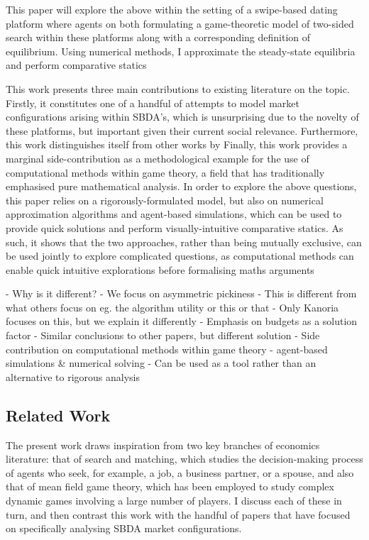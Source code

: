 This paper will explore the above within the setting of a swipe-based dating platform where agents on both formulating a game-theoretic model of two-sided search within these platforms along with a corresponding definition of equilibrium. 
Using numerical methods, I approximate the steady-state equilibria and perform comparative statics 

This work presents three main contributions to existing literature on the topic. 
Firstly, it constitutes one of a handful of attempts to model market configurations arising within SBDA's, which is unsurprising due to the novelty of these platforms, but important given their current social relevance. 
Furthermore, this work distinguishes itself from other works by 
Finally, this work provides a marginal side-contribution as a methodological example for the use of computational methods within game theory, a field that has traditionally emphasised pure mathematical analysis. 
In order to explore the above questions, this paper relies on a rigorously-formulated model, but also on numerical approximation algorithms and agent-based simulations, which can be used to provide quick solutions and perform visually-intuitive comparative statics. 
As such, it shows that the two approaches, rather than being mutually exclusive, can be used jointly to explore complicated questions, as computational methods can enable quick intuitive explorations before formalising maths arguments

- Why is it different?
    - We focus on asymmetric pickiness
    - This is different from what others focus on eg. the algorithm utility or this or that 
    - Only Kanoria focuses on this, but we explain it differently
    - Emphasis on budgets as a solution factor
    - Similar conclusions to other papers, but different solution
- Side contribution on computational methods within game theory
    - agent-based simulations \& numerical solving
    - Can be used as a tool rather than an alternative to rigorous analysis 



\subsection{Related Work}
The present work draws inspiration from two key branches of economics literature: that of search and matching, which studies the decision-making process of agents who seek, for example, a job, a business partner, or a spouse, and also that of mean field game theory, which has been employed to study complex dynamic games involving a large number of players. I discuss each of these in turn, and then contrast this work with the handful of papers that have focused on specifically analysing SBDA market configurations.

